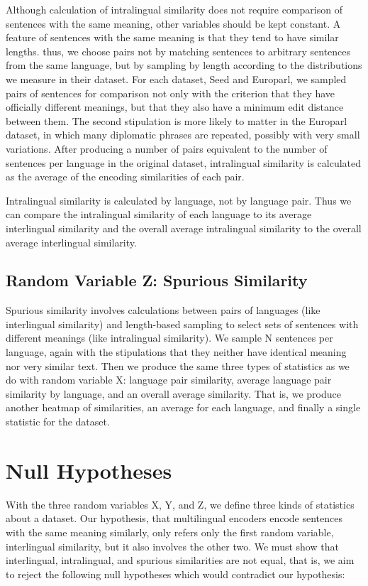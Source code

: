 Although calculation of intralingual similarity does not require comparison of sentences with the same meaning, other variables should be kept constant. A feature of sentences with the same meaning is that they tend to have similar lengths. thus, we choose pairs not by matching sentences to arbitrary sentences from the same language, but by sampling by length according to the distributions we measure in their dataset. For each dataset, Seed and Europarl, we sampled pairs of sentences for comparison not only with the criterion that they have officially different meanings, but that they also have a minimum edit distance between them. The second stipulation is more likely to matter in the Europarl dataset, in which many diplomatic phrases are repeated, possibly with very small variations. After producing a number of pairs equivalent to the number of sentences per language in the original dataset, intralingual similarity is calculated as the average of the encoding similarities of each pair.  

Intralingual similarity is calculated by language, not by language pair. Thus we can compare the intralingual similarity of each language to its average interlingual similarity and the overall average intralingual similarity to the overall average interlingual similarity. 

\subsection{Random Variable Z: Spurious Similarity}

Spurious similarity involves calculations between pairs of languages (like interlingual similarity) and length-based sampling to select sets of sentences with different meanings (like intralingual similarity). We sample N sentences per language, again with the stipulations that they neither have identical meaning nor very similar text. Then we produce the same three types of statistics as we do with random variable X: language pair similarity, average language pair similarity by language, and an overall average similarity. That is, we produce another heatmap of similarities, an average for each language, and finally a single statistic for the dataset. 

\section{Null Hypotheses}

With the three random variables X, Y, and Z, we define three kinds of statistics about a dataset. Our hypothesis, that multilingual encoders encode sentences with the same meaning similarly, only refers only the first random variable, interlingual similarity, but it also involves the other two. We must show that interlingual, intralingual, and spurious similarities are not equal, that is, we aim to reject the following null hypotheses which would contradict our hypothesis:

